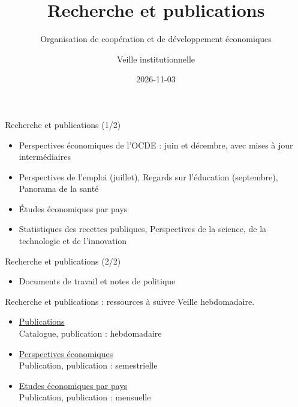 \documentclass[aspectratio=169,11pt]{beamer}
\title{Recherche et publications}
\subtitle{Organisation de coopération et de développement économiques}
\author{Veille institutionnelle}
\date{2026-11-03}
\begin{document}
\begin{frame}\titlepage\end{frame}

\begin{frame}{Recherche et publications (1/2)}
\begin{itemize}
\item Perspectives économiques de l'OCDE : juin et décembre, avec mises à jour intermédiaires
\item Perspectives de l'emploi (juillet), Regards sur l'éducation (septembre), Panorama de la santé
\item Études économiques par pays
\item Statistiques des recettes publiques, Perspectives de la science, de la technologie et de l'innovation
\end{itemize}
\end{frame}

\begin{frame}{Recherche et publications (2/2)}
\begin{itemize}
\item Documents de travail et notes de politique
\end{itemize}
\end{frame}

\begin{frame}{Recherche et publications : ressources à suivre}
\small
Veille hebdomadaire.
\begin{itemize}
\item \href{https://www.oecd.org/en/publications.html}{Publications}\\{\footnotesize Catalogue, publication : hebdomadaire}
\item \href{https://www.oecd.org/en/publications/serials/oecd-economic-outlook_16097408.html}{Perspectives économiques}\\{\footnotesize Publication, publication : semestrielle}
\item \href{https://www.oecd.org/en/publications/serials/oecd-economic-surveys_16097416.html}{Etudes économiques par pays}\\{\footnotesize Publication, publication : mensuelle}
\end{itemize}
\end{frame}
\end{document}
